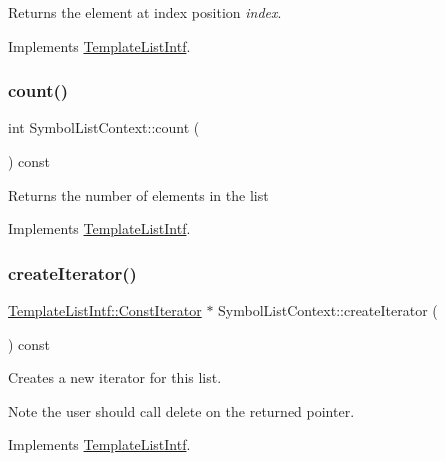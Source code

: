 Returns the element at index position {\itshape index}. 

Implements \mbox{\hyperlink{class_template_list_intf_aa51e57e72eacf4e8ce1055ee30a0f7f8}{Template\+List\+Intf}}.

\mbox{\label{class_symbol_list_context_a7e3a32d2decc135e7fdf6141fee37471}} 
\subsubsection{\texorpdfstring{count()}{count()}}
{\footnotesize\ttfamily int Symbol\+List\+Context\+::count (\begin{DoxyParamCaption}{ }\end{DoxyParamCaption}) const\hspace{0.3cm}{\ttfamily [virtual]}}

Returns the number of elements in the list 

Implements \mbox{\hyperlink{class_template_list_intf_a329e49e33484c2aa5106aac1bf4e5216}{Template\+List\+Intf}}.

\mbox{\label{class_symbol_list_context_a4a06f0941b227a1ed2baa3bf8f1d61ea}} 
\subsubsection{\texorpdfstring{createIterator()}{createIterator()}}
{\footnotesize\ttfamily \mbox{\hyperlink{class_template_list_intf_1_1_const_iterator}{Template\+List\+Intf\+::\+Const\+Iterator}} $\ast$ Symbol\+List\+Context\+::create\+Iterator (\begin{DoxyParamCaption}{ }\end{DoxyParamCaption}) const\hspace{0.3cm}{\ttfamily [virtual]}}

Creates a new iterator for this list. \begin{DoxyNote}{Note}
the user should call delete on the returned pointer. 
\end{DoxyNote}


Implements \mbox{\hyperlink{class_template_list_intf_a56b82384db24c3e121076a1da046d378}{Template\+List\+Intf}}.

